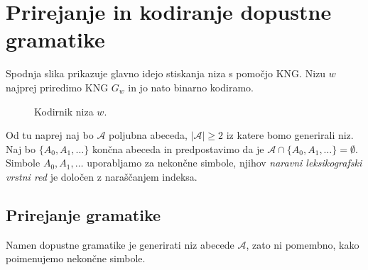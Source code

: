 \documentclass[fin1, tisk]{fmfdelo}
\providecommand{\abs}[1]{\left\lvert #1 \right\rvert}
\newcommand{\A}{\mathcal{A}}
\theoremstyle{definition}
\begin{document}
\section{Prirejanje in kodiranje dopustne gramatike} 

Spodnja slika prikazuje glavno idejo stiskanja niza s pomočjo KNG.
Nizu $w$ najprej priredimo KNG $G_w$ in jo nato binarno kodiramo.

\begin{figure}[H]
    \centering
    \caption{Kodirnik niza $w$.}
    \label{fig:Kodirnik}
\end{figure}

Od tu naprej naj bo $\A$ poljubna abeceda, $\abs{\A} \geq 2$ iz katere bomo generirali niz.
Naj bo $\{ A_0, A_1, \ldots \}$ končna abeceda in predpostavimo da je
$\A \cap \{ A_0, A_1, \ldots \} = \emptyset$. Simbole $A_0, A_1, \ldots$ uporabljamo za nekončne 
simbole, njihov \emph{naravni leksikografski vrstni red} je določen z naraščanjem indeksa.

\subsection{Prirejanje gramatike}

Namen dopustne gramatike je generirati niz abecede $\A$, zato ni
pomembno, kako poimenujemo nekončne simbole.
\end{document}
